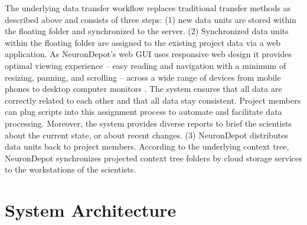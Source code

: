 \documentclass{frontiersSCNS} %
\begin{document}
The underlying data transfer workflow replaces traditional transfer methods as
described above and consists of three steps: (1) new data units are stored
within the floating folder and synchronized to the server. (2) Synchronized
data units within the floating folder are assigned to the existing project data
via a web application. As NeuronDepot's web GUI uses responsive web design it
provides optimal viewing experience -- easy reading and navigation with a
minimum of resizing, panning, and scrolling -- across a wide range of devices
from mobile phones to desktop computer monitors
\citep{marcotte_responsive_2010}. The system ensures that all data are
correctly related to each other and that all data stay consistent. Project
members can plug scripts into this assignment process to automate and
facilitate data processing. Moreover, the system provides diverse reports to
brief the scientists about the current state, or about recent changes. (3)
NeuronDepot distributes data units back to project members. According to the
underlying context tree, NeuronDepot synchronizes projected context tree
folders by cloud storage services to the workstations of the scientists.


\section{System Architecture}\label{sec:architecture}
\end{document}
